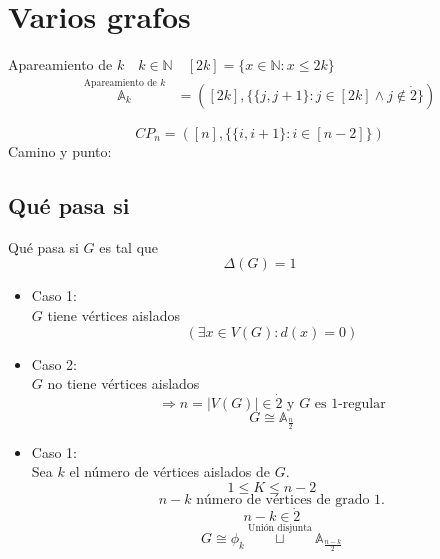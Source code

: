 \documentclass[../main.tex]{subfiles}
\begin{document}
\chapter{Varios grafos}%

\thispagestyle{fancy}

Apareamiento de $k\quad k\in \mathbb{N}\quad [2k]=\{x\in\mathbb{N}:x\leq 2k\}$
\begin{align*}
	\overset
	{
		\text{Apareamiento de $k$}
	}
	{
		\mathbb{A}_k
	}
	&=
	(
		[2k],
		\{
			\{j,j+1\}:
			j\in [2k] \wedge j \notin \dot{2}
		\}
	)
\end{align*}

\begin{figure}[H]
	\centering
	
\end{figure}

\begin{figure}[H]
	\centering
	
\end{figure}

\[
	CP_n =
	(
		[n],
		\{
			\{i,i+1\}:
			i \in[n-2]
		\}
	)
\]
Camino y punto:

\begin{figure}[H]
	\centering
	
\end{figure}

\section{Qué pasa si}%
\label{sec:que_pasa_si}

Qué pasa si $G$ es tal que
\[\Delta(G)=1\]
\begin{itemize}
	\item Caso 1:\\
		$G$ tiene vértices aislados
		\[
			(\exists x \in V(G):d(x)=0)
		\]
	\item Caso 2:\\
		$G$ no tiene vértices aislados
		\[
			\Rightarrow n = |V(G)|\in\dot{2}
			\text{ y $G$ es 1-regular}
		\]
		\[
			G \cong \mathbb{A}_{\frac{n}{2}}
		\]
\end{itemize}

\begin{itemize}
	\item Caso 1:\\
		Sea $k$ el número de vértices aislados de $G$.
		\[
			1 \leq K \leq n-2
		\]
		\[
			n-k \text{  número de vértices de grado 1.}
		\]
		\[
			n-k \in \dot{2}
		\]
		\[
			G \cong \phi_k
			\overset
			{
				\text{Unión disjunta}
			}
			{
				\sqcup
			}
			\mathbb{A}_{\frac{n-k}{2}}
		\]
\end{itemize}
\end{document}
